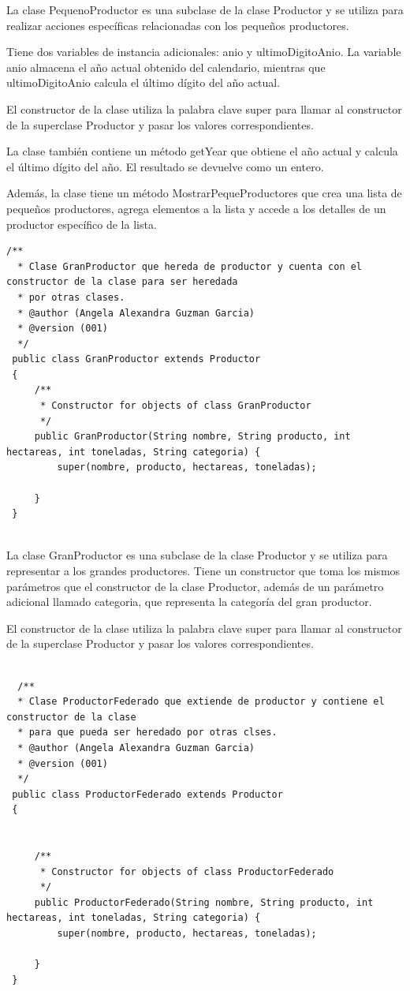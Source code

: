 \documentclass[10pt,a4paper]{article}
\def\StartLineAt#1{\lstset{firstnumber=#1}}
\begin{document}
La clase PequenoProductor es una subclase de la clase Productor y se utiliza para realizar acciones específicas relacionadas con los pequeños productores.

Tiene dos variables de instancia adicionales: anio y ultimoDigitoAnio. La variable anio almacena el año actual obtenido del calendario, mientras que ultimoDigitoAnio calcula el último dígito del año actual.

El constructor de la clase utiliza la palabra clave super para llamar al constructor de la superclase Productor y pasar los valores correspondientes.

La clase también contiene un método getYear que obtiene el año actual y calcula el último dígito del año. El resultado se devuelve como un entero.

Además, la clase tiene un método MostrarPequeProductores que crea una lista de pequeños productores, agrega elementos a la lista y accede a los detalles de un productor específico de la lista.

\StartLineAt{1}
\begin{lstlisting}[style=Java]
  /**
  * Clase GranProductor que hereda de productor y cuenta con el constructor de la clase para ser heredada
  * por otras clases.
  * @author (Angela Alexandra Guzman Garcia) 
  * @version (001)
  */
 public class GranProductor extends Productor
 {
     /**
      * Constructor for objects of class GranProductor
      */
     public GranProductor(String nombre, String producto, int hectareas, int toneladas, String categoria) {
         super(nombre, producto, hectareas, toneladas);
         
     }
 }
 
\end{lstlisting}

La clase GranProductor es una subclase de la clase Productor y se utiliza para representar a los grandes productores. Tiene un constructor que toma los mismos parámetros que el constructor de la clase Productor, además de un parámetro adicional llamado categoria, que representa la categoría del gran productor.

El constructor de la clase utiliza la palabra clave super para llamar al constructor de la superclase Productor y pasar los valores correspondientes.


\StartLineAt{1}
\begin{lstlisting}[style=Java]

  /**
  * Clase ProductorFederado que extiende de productor y contiene el constructor de la clase
  * para que pueda ser heredado por otras clses.
  * @author (Angela Alexandra Guzman Garcia) 
  * @version (001)
  */
 public class ProductorFederado extends Productor
 {
     
 
     /**
      * Constructor for objects of class ProductorFederado
      */
     public ProductorFederado(String nombre, String producto, int hectareas, int toneladas, String categoria) {
         super(nombre, producto, hectareas, toneladas);
         
     }
 }  
\end{lstlisting}
\end{document}
